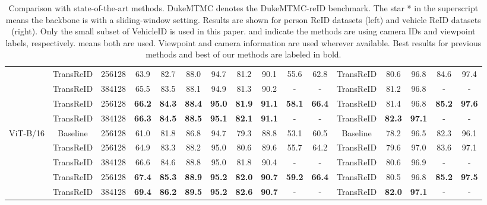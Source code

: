 \documentclass[10pt,twocolumn,letterpaper]{article}
\begin{document}
\begin{table*}[ht]
\begin{center}
\begin{tabular}{ccc|cccccccc||c|cccc}
    &TransReID & 256128 & 63.9 & 82.7 & 88.0  &94.7  &81.2 &90.1 &55.6 &62.8 
    &TransReID  &80.6 &96.8 &84.6 &97.4\\
    
    &TransReID & 384128 &65.5 &83.5&88.1 &94.9&81.3 &90.2&- &-  
    &TransReID  & 81.2 & 96.8 & - & -\\
    
    &TransReID & 256128 &\textbf{66.2} & \textbf{84.3} & \textbf{88.4} & \textbf{95.0} & \textbf{81.9} & \textbf{91.1} & \textbf{58.1} & \textbf{66.4}
    &TransReID&81.4 &96.8 &\textbf{85.2} &\textbf{97.6}  \\
    
    &TransReID & 384128 &\textbf{66.3} &\textbf{84.5} &\textbf{88.5} &\textbf{95.1} &\textbf{82.1} &\textbf{91.1}&- &- &TransReID &\textbf{82.3} &\textbf{97.1} &- &-  \\
    \hline
    
    \multirow{5}{*}{ViT-B/16} &Baseline & 256128 & 61.0 & 81.8 & 86.8  &94.7  &79.3 &88.8 &53.1 &60.5 
    &Baseline &78.2 &96.5 &82.3 &96.1\\
    &TransReID & 256128 & 64.9  &83.3  &88.2  &95.0  &80.6 &89.6 &55.7 &64.2 
    &TransReID  &79.6 &97.0 &83.6&97.1\\
    &TransReID & 384128 & 66.6 & 84.6 & 88.8 & 95.0 & 81.8&90.4 &- &-  
    &TransReID  &  80.6 & 96.9 &-&-\\
    &TransReID & 256128 & \textbf{67.4} & \textbf{85.3} & \textbf{88.9} & \textbf{95.2} &\textbf{82.0} &\textbf{90.7} &\textbf{59.2} &\textbf{66.4}
    &TransReID  &  80.5 & 96.8 &\textbf{85.2}  & \textbf{97.5}\\
    &TransReID & 384128 & \textbf{69.4} & \textbf{86.2} & \textbf{89.5} & \textbf{95.2} &\textbf{82.6} &\textbf{90.7} &- &- 
    &TransReID  &\textbf{82.0}  & \textbf{97.1}  & - & -\\
    \hline
    \end{tabular}
    \vspace{-1em}
    \end{center}
    \caption{\label{tab:sota} Comparison with state-of-the-art methods. DukeMTMC denotes the DukeMTMC-reID benchmark. The star * in the superscript means the backbone is with a sliding-window setting. Results are shown for person ReID datasets (left) and vehicle ReID datasets (right). Only the small subset of VehicleID is used in this paper.  and  indicate the methods are using camera IDs and viewpoint labels, respectively.  means both are used. Viewpoint and camera information are used wherever available. Best results for previous methods and best of our methods are labeled in bold.}
\end{table*}
\end{document}

